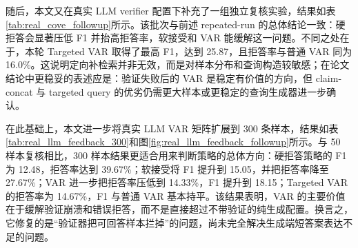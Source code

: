 随后，本文又在真实 LLM verifier 配置下补充了一组独立复核实验，结果如表\ref{tab:real_cove_followup}所示。该批次与前述 repeated-run 的总体结论一致：硬拒答会显著压低 F1 并抬高拒答率，软接受和 VAR 能缓解这一问题。不同之处在于，本轮 Targeted VAR 取得了最高 F1，达到 25.87，且拒答率与普通 VAR 同为 16.0\%。这说明定向补检索并非无效，而是对样本分布和查询构造较敏感；在论文结论中更稳妥的表述应是：验证失败后的 VAR 是稳定有价值的方向，但 claim-concat 与 targeted query 的优劣仍需更大样本或更稳定的查询生成器进一步确认。

\begin{table}[!htbp]
\centering
\caption{真实 LLM CoVe 条件下 VAR 的独立复核结果（HotpotQA, N=50）}
\label{tab:real_cove_followup}
\end{table}

在此基础上，本文进一步将真实 LLM VAR 矩阵扩展到 300 条样本，结果如表\ref{tab:real_llm_feedback_300}和图\ref{fig:real_llm_feedback_followup}所示。与 50 样本复核相比，300 样本结果更适合用来判断策略的总体方向：硬拒答策略的 F1 为 12.48，拒答率达到 39.67\%；软接受将 F1 提升到 15.05，并把拒答率降至 27.67\%；VAR 进一步把拒答率压低到 14.33\%，F1 提升到 18.15；Targeted VAR 的拒答率为 14.67\%，F1 与普通 VAR 基本持平。该结果表明，VAR 的主要价值在于缓解验证崩溃和错误拒答，而不是直接超过不带验证的纯生成配置。换言之，它修复的是“验证器把可回答样本拦掉”的问题，尚未完全解决生成端短答案表达不足的问题。

\begin{table}[!htbp]
\centering
\caption{真实 LLM VAR 复核结果（HotpotQA, N=300）}
\label{tab:real_llm_feedback_300}
\end{table}

